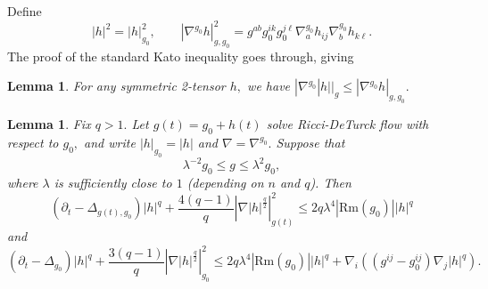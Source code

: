 \documentclass[12pt]{amsart}
\renewcommand{\1}{{\mathbf 1}}
\newcommand{\Rm}{\mathrm{Rm}}
\newcommand{\eps}{{\varepsilon}}
\newtheorem{lemma}[thm]{Lemma}
\theoremstyle{others}
\numberwithin{equation}{section}
\begin{document}
Define
$$| h |^2 = |h |^2_{g_0}, \qquad | \nabla^{g_0} h |_{g,g_0}^2 = g^{ab} g_0^{ik}g_0^{j\ell} \nabla^{g_0}_a h_{ij} \nabla^{g_0}_b h_{k \ell}.$$
The proof of the standard Kato inequality goes through, giving %
\begin{lemma}\label{lemma:kato} For any symmetric 2-tensor $h,$ we have
$| \nabla^{g_0} |h| |_g \leq | \nabla^{g_0} h |_{g,g_0}.$
\end{lemma}



\begin{lemma}\label{lemma:hpevolution} %
Fix $q > 1.$ Let $g(t) = g_0 + h(t)$ solve Ricci-DeTurck flow with respect to $g_0,$ and write $|h|_{g_0} = |h|$ and $\nabla = \nabla^{g_0}.$ Suppose that
\begin{equation}\label{gg0lambdaassumption}
\lambda^{-2} g_0 \leq g \leq \lambda^2 g_0,
\end{equation}
where $\lambda$ is sufficiently close to $1$ (depending on $n$ and $q$).
Then
    \begin{equation}\label{evolutionof|h|^q}
        \left( \partial_t - \Delta_{g(t), g_0} \right) |h|^{q} + \frac{4(q-1)}{q} \left| \nabla |h|^{\frac{q}{2}} \right|_{g(t)}^2 \leq 2q \lambda^4 |\Rm(g_0)| |h|^{q}
    \end{equation}
    and
        \begin{equation}\label{g0evolutionof|h|^q}
        \left( \partial_t - \Delta_{ g_0} \right) |h|^{q} + \frac{3(q-1)}{q} \left| \nabla |h|^{\frac{q}{2}} \right|_{g_0}^2 \leq 2q \lambda^4 |\Rm(g_0)| |h|^{q} + \nabla_i \left( \left( g^{ij} - g_0^{ij} \right) \nabla_j |h|^q \right).
    \end{equation}
\end{lemma}
\end{document}
